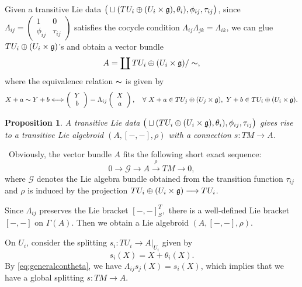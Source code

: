 \documentclass[letterpaper,10pt, oneside]{article} %
\newtheorem{pro}[thm]{Proposition}
\newcommand{\brtls}[1]{   [    #1   ]_S^T   }
\newcommand{\pf}{\noindent{\bf Proof.}\ }
\newcommand{\huaG}{\mathcal{G}}
\def\qed{\hfill ~\vrule height6pt width6pt depth0pt}
\begin{document}
 Given a transitive Lie data  $\big(\sqcup(TU_i\oplus(U_i\times\mathfrak g),\theta_i),\phi_{ij},\tau_{ij}\big)$, since $\Lambda_{ij}=\left(\begin{array}{cc}
1&0\\
\phi_{ij}&\tau_{ij}
\end{array} \right) $ satisfies the cocycle condition $\Lambda_{ij}\Lambda_{jk}=\Lambda_{ik}$, we can glue $TU_i\oplus (U_i\times\mathfrak g)$'s and obtain a  vector bundle
\begin{equation} \label{eq:glue-A}
A=\coprod TU_i\oplus (U_i\times\mathfrak g)/\thicksim,
\end{equation}
where the equivalence relation $\thicksim$ is given by
$$
X+a\thicksim Y+b \Longleftrightarrow \left(\begin{array}{c}Y\\b\end{array}\right)=\Lambda_{ij}\left(\begin{array}{c}X\\a\end{array}\right),\quad\forall ~X+a\in TU_j\oplus (U_j\times\mathfrak g),~Y+b\in TU_i\oplus  (U_i\times \mathfrak g).
$$
 \begin{pro}\label{pro:tlo} \label{thm:tlo}
   A transitive Lie data  $\big(\sqcup(TU_i\oplus(U_i\times\mathfrak g),\theta_i),\phi_{ij},\tau_{ij}\big)$  gives rise to a transitive Lie algebroid $(A,[-,-],\rho)$ with a connection $s:TM\longrightarrow A$.
\end{pro}
 \pf Obviously, the vector bundle $A$
 fits the following short exact sequence:
$$
0\stackrel{}{\longrightarrow}\huaG\stackrel{}{\longrightarrow}A\stackrel{\rho}{\longrightarrow}TM\stackrel{}{\longrightarrow}0,
$$
where $\huaG$ denotes the Lie algebra bundle obtained from the transition function $\tau_{ij}$ and $\rho$ is induced by the projection $TU_i\oplus (U_i\times\mathfrak g)\longrightarrow TU_i$.

Since $\Lambda_{ij}$ preserves the Lie bracket $\brtls{-,-},$ there is a well-defined Lie bracket $[-,-]$ on $\Gamma(A)$. Then we obtain a Lie algebroid $(A,[-,-],\rho)$.

On $U_i$, consider the splitting $s_i:TU_i\longrightarrow A|_{U_i}$ given by
$$
s_i(X)=X+\theta_i(X).
$$
By \eqref{eq:generalcontheta}, we have
$\Lambda_{ij}s_j(X)=s_i(X)$, which implies that we have a global splitting $s:TM\longrightarrow A.$  \qed\vspace{3mm}
\end{document}
